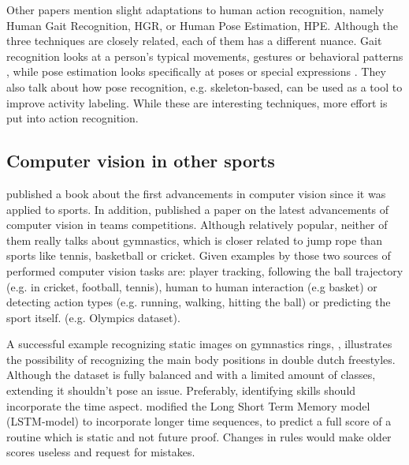 Other papers mention slight adaptations to human action recognition, namely Human Gait Recognition, HGR, or Human Pose Estimation, HPE. Although the three techniques are closely related, each of them has a different nuance. Gait recognition looks at a person's typical movements, gestures or behavioral patterns \autocite{Alharthi_2019}, while pose estimation looks specifically at poses or special expressions \autocite{Song_2021}. They also talk about how pose recognition, e.g. skeleton-based, can be used as a tool to improve activity labeling.
While these are interesting techniques, more effort is put into action recognition.





\subsection{Computer vision in other sports}
\label{lit:computer-vision-sports}

\textcite{Soomro_2014} published a book about the first advancements in computer vision since it was applied to sports. In addition, \textcite{Yin_2024} published a paper on the latest advancements of computer vision in teams competitions. Although relatively popular, neither of them really talks about gymnastics, which is closer related to jump rope than sports like tennis, basketball or cricket.
Given examples by those two sources of performed computer vision tasks are: player tracking, following the ball trajectory (e.g. in cricket, football, tennis), human to human interaction (e.g basket) or detecting action types (e.g. running, walking, hitting the ball) or predicting the sport itself. (e.g. Olympics dataset).

A successful example recognizing static images on gymnastics rings, \textcite{Abdullah_2023}, illustrates the possibility of recognizing the main body positions in double dutch freestyles. Although the dataset is fully balanced and with a limited amount of classes, extending it shouldn't pose an issue. Preferably, identifying skills should incorporate the time aspect.
\textcite{Zahan_2023} modified the Long Short Term Memory model (LSTM-model) to incorporate longer time sequences, to predict a full score of a routine which is static and not future proof. Changes in rules would make older scores useless and request for mistakes.

